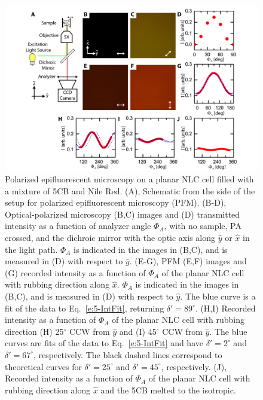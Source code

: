 \begin{figure}
  \centering
  \includegraphics{figures/C5/Ch5-Figs_PFM_FlatCell.png}
  \caption{Polarized epifluorescent microscopy on a planar NLC cell filled with a mixture of 5CB and Nile Red.
  (A), Schematic from the side of the setup for polarized epifluorescent microscopy (PFM).
  (B-D), Optical-polarized microscopy (B,C) images and (D) transmitted intensity as a function of analyzer angle $\Phi_A$, with no sample, PA crossed, and the dichroic mirror with the optic axis along $\hat{y}$ or $\hat{x}$ in the light path.
  $\Phi_A$ is indicated in the images in (B,C), and is measured in (D) with respect to $\hat{y}$.
  (E-G), PFM (E,F) images and (G) recorded intensity as a function of $\Phi_A$ of the planar NLC cell with rubbing direction along $\hat{x}$.
  $\Phi_A$ is indicated in the images in (B,C), and is measured in (D) with respect to $\hat{y}$.
  The blue curve is a fit of the data to Eq.~\ref{e:5-IntFit}, returning $\delta' = 89^{\circ}$.
  (H,I) Recorded intensity as a function of $\Phi_A$ of the planar NLC cell with rubbing direction (H) 25$^{\circ}$ CCW from $\hat{y}$ and (I) 45$^{\circ}$ CCW from $\hat{y}$.
  The blue curves are fits of the data to Eq.~\ref{e:5-IntFit} and have $\delta' = 2^{\circ}$ and $\delta' = 67^{\circ}$, respectively.
  The black dashed lines correspond to theoretical curves for $\delta' = 25^{\circ}$ and $\delta' = 45^{\circ}$, respectively.
  (J), Recorded intensity as a function of $\Phi_A$ of the planar NLC cell with rubbing direction along $\hat{x}$ and the 5CB melted to the isotropic.}\label{f:5-PFM_FlatCell}
\end{figure}

